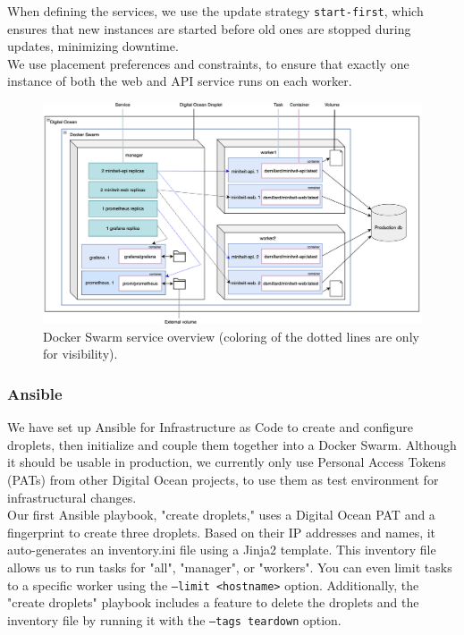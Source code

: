 When defining the services, we use the update strategy \texttt{start-first}, which ensures that new instances are started before old ones are stopped during updates, minimizing downtime. \\

We use placement preferences and constraints, to ensure that exactly one instance of both the web and API service runs on each worker. \\

\begin{figure}[H]
  \centering
  \includegraphics[width=\textwidth]{Images/docker_swarm.png}
  \caption{Docker Swarm service overview (coloring of the dotted lines are only for visibility).}
  \label{fig:dashboard}
\end{figure}
\subsubsection*{Ansible}
We have set up Ansible for Infrastructure as Code to create and configure droplets, then initialize and couple them together into a Docker Swarm. Although it should be usable in production, we currently only use Personal Access Tokens (PATs) from other Digital Ocean projects, to use them as test environment for infrastructural changes. \\

Our first Ansible playbook, "create droplets," uses a Digital Ocean PAT and a fingerprint to create three droplets. Based on their IP addresses and names, it auto-generates an inventory.ini file using a Jinja2 template. This inventory file allows us to run tasks for "all", "manager", or "workers". You can even limit tasks to a specific worker using the \texttt{--limit <hostname>} option. Additionally, the "create droplets" playbook includes a feature to delete the droplets and the inventory file by running it with the \texttt{--tags teardown} option.\\

